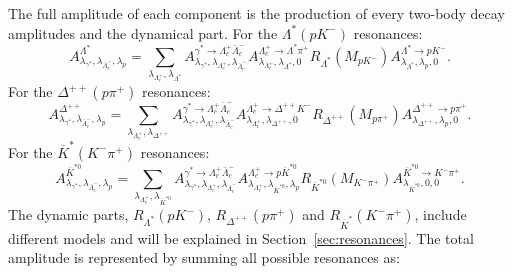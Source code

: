 The full amplitude of each component is the production of every two-body decay amplitudes and the dynamical part. For the $\Lambda^*(pK^-)$ resonances:   
\begin{equation}
    A_{\lambda_{\gamma^*},\lambda_{\bar{\Lambda}_c^{-}},\lambda_p}^{\Lambda^*} = \sum_{\lambda_{\Lambda_c^+},\lambda_{\Lambda^*}}A_{\lambda_{\gamma^*},\lambda_{\Lambda_c^+},\lambda_{\bar{\Lambda}_c^-}}^{\gamma^* \to \Lambda_c^+\bar{\Lambda}_c^-}A_{\lambda_{\Lambda_c^+},\lambda_{\Lambda^*},0}^{\Lambda_c^+\to\Lambda^*\pi^+}R_{\Lambda^*}(M_{pK^-})A_{\lambda_{\Lambda^*},\lambda_p,0}^{\Lambda^*\to pK^-}.
\end{equation}
For the $\Delta^{++}(p\pi^+)$ resonances: 
\begin{equation}
    A_{\lambda_{\gamma^*},\lambda_{\bar{\Lambda}_c^{-}},\lambda_p}^{\Delta^{++}} = \sum_{\lambda_{\Lambda_c^+},\lambda_{\Delta^{++}}}A_{\lambda_{\gamma^*},\lambda_{\Lambda_c^+},\lambda_{\bar{\Lambda}_c^-}}^{\gamma^* \to \Lambda_c^+\bar{\Lambda}_c^-}A_{\lambda_{\Lambda_c^+},\lambda_{\Delta^{++}},0}^{\Lambda_c^+\to\Delta^{++}K^-}R_{\Delta^{++}}(M_{p\pi^+})A_{\lambda_{\Delta^{++}},\lambda_p,0}^{\Delta^{++}\to p\pi^+}.
\end{equation}
For the $\overline{K}^*(K^-\pi^+)$ resonances:
\begin{equation}
    A_{\lambda_{\gamma^*},\lambda_{\bar{\Lambda}_c^{-}},\lambda_p}^{\overline{K}^{*0}} = \sum_{\lambda_{\Lambda_c^+},\lambda_{\overline{K}^{*0}}}A_{\lambda_{\gamma^*},\lambda_{\Lambda_c^+},\lambda_{\bar{\Lambda}_c^-}}^{\gamma^* \to \Lambda_c^+\bar{\Lambda}_c^-}A_{\lambda_{\Lambda_c^+},\lambda_{\overline{K}^{*0}},\lambda_p}^{\Lambda_c^+\to p \overline{K}^{*0}}R_{\overline{K}^{*0}}(M_{K^-\pi^+})A_{\lambda_{\overline{K}^{*0}},0,0}^{\overline{K}^{*0}\to K^-\pi^+}.
\end{equation}
The dynamic parts, $R_{\Lambda^*}(pK^-)$, $R_{\Delta^{++}}(p\pi^+)$ and $R_{\overline{K}^*}(K^-\pi^+)$, include different models and will be explained in Section~\ref{sec:resonances}.
The total amplitude is represented by summing all possible resonances as:
